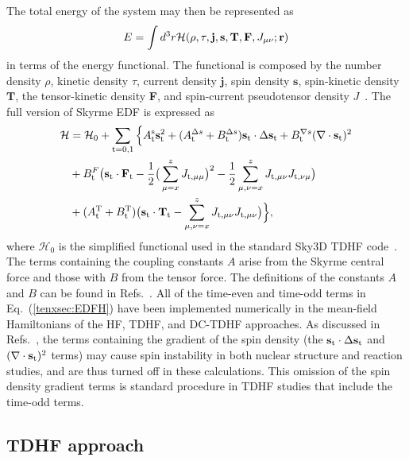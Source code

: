 The total energy of the system may then be represented as
\begin{equation}
E=\int d^3r  {\cal H}(\rho, \tau, {\mathbf{j}}, {\textbf{s}}, {\textbf{T}}, {\textbf{F}}, J_{\mu\nu}; {\mathbf{r}})
\end{equation}
in terms of the energy functional. The functional is composed by
the number density $\rho$, kinetic density $\tau$, current density ${\mathbf{j}}$, spin density ${\mathbf{s}}$, spin-kinetic density ${\mathbf{T}}$,
the tensor-kinetic density {\textbf{F}}, and spin-current pseudotensor density $J$~\citep{stevenson2016}. The full version of Skyrme EDF is expressed as
\begin{align}
\label{tenxsec:EDFH}
\begin{split}
\mathcal{H}&=\mathcal{H}_0+\sum_{\rm{t=0,1}}\Big\{A_{\rm{t}}^{\rm{s}}\mathbf{s}_{\rm{t}}^2+(A_{\rm{t}}^{\Delta{s}}+B_{\rm{t}}^{\Delta{s}})
\mathbf{s}_{\rm{t}}\cdot\Delta\mathbf{s}_{\rm{t}}+B_{\rm{t}}^{\nabla s}(\nabla\cdot \mathbf{s}_{\rm{t}})^2 \\
&+B_{\rm{t}}^{F}\big(\mathbf{s}_{\rm{t}}\cdot
\mathbf {F}_{\rm{t}}-\frac{1}{2}\big(\sum_{\mu=x}^{z}J_{\rm{t}, \mu\mu}\big)^2-\frac{1}{2}\sum_{\mu, \nu=x}^{z}J_{\rm{t}, \mu\nu}J_{\rm{t}, \nu \mu}\big)\\
&+(A_{\rm{t}}^{\rm{T}}+B_{\rm{t}}^{\rm{T}})\big(\mathbf{s}_{\rm{t}}\cdot\mathbf{T}_{\rm{t}}-
\sum_{\mu,\nu=x}^{z}J_{\rm{t},\mu\nu}J_{\rm{t},\mu\nu}\big)\Big\},
\end{split}
\end{align}
where $\mathcal{H}_0$ is the simplified functional used in the standard Sky3D TDHF code~\citep{maruhn2014}.
The terms containing the coupling constants $A$ arise from the Skyrme central force and those with $B$ from the tensor force. The definitions of the constants $A$ and $B$
can be found in Refs.~\citep{lesinski2007,davesne2009}. All of the time-even and time-odd terms in Eq.~(\ref{tenxsec:EDFH}) have been implemented numerically in the mean-field Hamiltonians of the HF, TDHF, and DC-TDHF approaches.
As discussed in Refs.~\citep{lesinski2007,stevenson2016}, the terms containing the gradient of the spin density (the $\mathbf{s}_{\rm{t}}\cdot\Delta\mathbf{s}_{\rm{t}}$ and $(\nabla\cdot \mathbf{s}_{\rm{t}})^2$ terms) may cause spin instability in both nuclear structure and reaction studies, and are thus turned off in these calculations.
This omission of the spin density gradient terms is standard procedure in TDHF studies that include the time-odd terms.


\subsection{TDHF approach}

